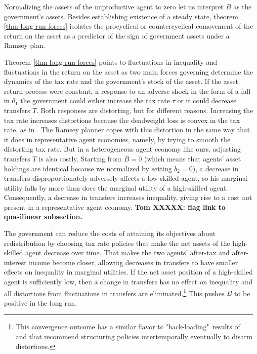 \documentclass[thmsb,11pt]{article}
\begin{document}
Normalizing the assets of the unproductive agent to zero %
let us  interpret $B$ as the government's assets.
Besides establishing existence of a steady state, theorem \ref{thm long run forces}
isolates the procyclical or countercyclical comovement of the return on the asset as a predictor of  the sign of government assets under a Ramsey plan.

Theorem \ref{thm long run forces}  points to fluctuations in inequality and fluctuations in the return on the asset as two main forces governing  determine the dynamics of the  tax rate
and the government's stock of the asset. If the  asset return process were constant, n response  to an adverse  shock in the form of a fall in $\theta_1$
the government could either increase the  tax rate $%
\tau $ or it could decrease transfers $T.$ Both  responses are distorting,
but for different reasons. Increasing the tax rate increases distortions because the deadweight loss is convex in the tax rate,
 as in \cite{Barro1979}. The Ramsey planner copes with this distortion  %
  in the same way that it does in  representative agent economies, namely, by trying to smooth the distorting tax rate.
 \color{black}
 But in a  heterogeneous agent economy like ours,  adjusting transfers $T$ is
also costly. Starting from $B=0$ (which means that    agents' asset holdings are identical  because we normalized by setting $b_2=0$),
a decrease in transfers  disproportionately adversely
affects a low-skilled agent, so his marginal utility
falls by more than does the marginal utility of a high-skilled agent. Consequently, a
decrease in transfers increases inequality, giving rise to a cost  not present in a representative agent economy.
\textbf{Tom XXXXX: flag link to quasilinear subsection.}

The government can reduce the costs of  attaining its objectives about  redistribution  by choosing
tax rate policies that make the net assets of  the high-skilled agent
decrease over time. That makes the two agents'
after-tax and after-interest income  become closer, allowing decreases in transfers to have smaller effects on inequality in
marginal utilities. If the net asset position of a high-skilled agent is
sufficiently low, then a change in transfers has no effect on inequality and
all  distortions from fluctuations in transfers are eliminated.\footnote{This convergence outcome has
 a similar flavor to "back-loading"\ results  of
 \cite{Ray2002} and \cite{Albanesi2012} that recommend structuring policies intertemporally eventually to disarm  distortions.} This pushes $B$ to be positive in the long run.
\end{document}
